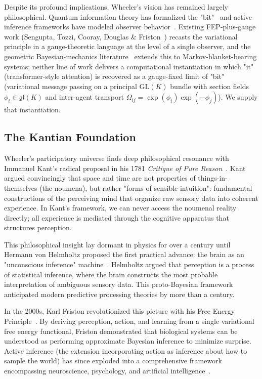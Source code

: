 \documentclass[11pt]{article}
\begin{document}
Despite its profound implications, Wheeler's vision has remained largely philosophical. Quantum information theory has formalized the "bit"~\cite{Shannon1948, CoverThomas2006} and active inference frameworks have modeled observer behavior~\cite{Friston2010, Friston2017}. Existing FEP-plus-gauge work (Sengupta, Tozzi, Cooray, Douglas \& Friston~\cite{Sengupta2016NeuronalGauge}) recasts the variational principle in a gauge-theoretic language at the level of a single observer, and the geometric Bayesian-mechanics literature~\cite{Sakthivadivel2022, KirchhoffParrPalaciosFristonKiverstein2018} extends this to Markov-blanket-bearing systems; neither line of work delivers a computational instantiation in which "it" (transformer-style attention) is recovered as a gauge-fixed limit of "bit" (variational message passing on a principal $\mathrm{GL}(K)$ bundle with section fields $\phi_i \in \mathfrak{gl}(K)$ and inter-agent transport $\Omega_{ij} = \exp(\phi_i)\exp(-\phi_j)$). We supply that instantiation.

\subsection{The Kantian Foundation}

Wheeler's participatory universe finds deep philosophical resonance with Immanuel Kant's radical proposal in his 1781 \emph{Critique of Pure Reason}~\cite{Kant1781}. Kant argued convincingly that space and time are not properties of things-in-themselves (the noumena), but rather "forms of sensible intuition": fundamental constructions of the perceiving mind that organize raw sensory data into coherent experience. In Kant's framework, we can never access the noumenal reality directly; all experience is mediated through the cognitive apparatus that structures perception.

This philosophical insight lay dormant in physics for over a century until Hermann von Helmholtz proposed the first practical advance: the brain as an "unconscious inference" machine~\cite{Helmholtz1867}. Helmholtz argued that perception is a process of statistical inference, where the brain constructs the most probable interpretation of ambiguous sensory data. This proto-Bayesian framework anticipated modern predictive processing theories by more than a century.

In the 2000s, Karl Friston revolutionized this picture with his Free Energy Principle~\cite{Friston2010}. By deriving perception, action, and learning from a single variational free energy functional, Friston demonstrated that biological systems can be understood as performing approximate Bayesian inference to minimize surprise. Active inference (the extension incorporating action as inference about how to sample the world) has since exploded into a comprehensive framework encompassing neuroscience, psychology, and artificial intelligence~\cite{parr2022active}.
\end{document}
